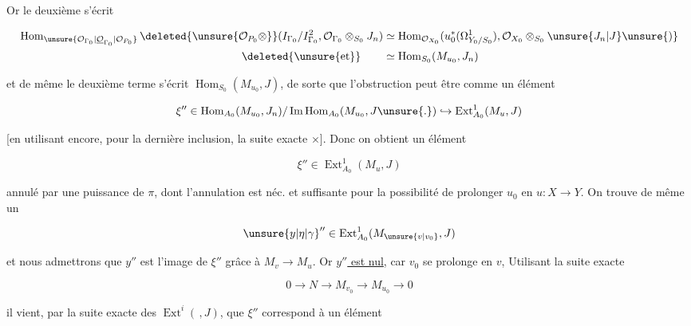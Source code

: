 Or le  deuxième  s'écrit

\[
\begin{aligned}
\operatorname{Hom}_{\unsure{\mathcal O_{\Gamma_0}|\underline{\mathcal O}_{\Gamma_0}|\mathcal O_{P_0}}}\deleted{\unsure{\mathcal O_{P_0}\otimes}}(I_{\Gamma_0}/I_{\Gamma_0}^2,\mathcal O_{\Gamma_0}\otimes_{S_0}J_n)&\simeq\operatorname{Hom}_{\mathcal O_{X_0}}(u_0^*(\Omega^1_{Y_0/S_0}),\mathcal O_{X_0}\otimes_{S_0}\unsure{J_n|J}\unsure{)} \\
\deleted{\unsure{\text{et}}}\qquad &\simeq\operatorname{Hom}_{S_0}(M_{u_0},J_n)
\end{aligned}
\]

et de même le deuxième terme s'écrit $\operatorname{Hom}_{S_0}(M_{u_0},J)$, de sorte que l'obstruction peut être  comme un élément

\[
\xi''\in\operatorname{Hom}_{A_0}(M_{u_0},J_n)/\operatorname{Im}\operatorname{Hom}_{A_0}(M_{u_0},J\unsure{.})\hookrightarrow\operatorname{Ext}^{1}_{A_0}(M_u,J)
\]

[en utilisant encore, pour la dernière inclusion, la suite exacte $\times$]. Donc on obtient un élément 

\[
\xi''\in\operatorname{Ext}^{1}_{A_0}(M_u,J)
\]

annulé par une puissance de $\pi$, dont l'annulation est néc. et suffisante pour la possibilité de prolonger $u_0$ en $u:X\longrightarrow Y$. On trouve de même un

\[
\unsure{y|\eta|\gamma}''\in\operatorname{Ext}^{1}_{A_0}(M_{\unsure{v|v_0}},J)
\]

et nous admettrons que $y''$ est l'image de $\xi''$ grâce à $M_v\longrightarrow M_u$. Or \uline{$y''$ est nul}, car $v_0$ se prolonge en $v$,  Utilisant la suite exacte

\[
0\to N\to M_{v_0}\to M_{u_0}\to0
\]

il vient, par la suite exacte des $\operatorname{Ext}^{i}(\,,J)$, que $\xi''$ correspond à un élément

